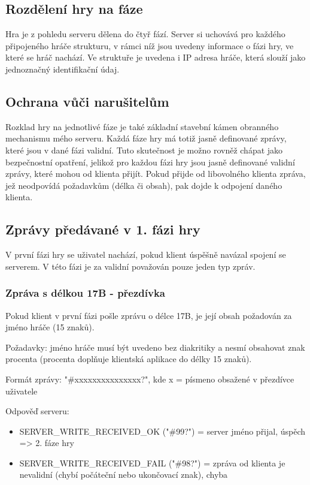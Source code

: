 \documentclass[12pt, a4paper, pdftex, czech, titlepage]{report}
\begin{document}
\subsection{Rozdělení hry na fáze}
Hra je z pohledu serveru dělena do čtyř fází. Server si uchovává pro každého připojeného hráče strukturu, v rámci
níž jsou uvedeny informace o fázi hry, ve které se hráč nachází. Ve struktuře 
je uvedena i IP adresa hráče, která slouží jako jednoznačný identifikační
údaj.

\subsection{Ochrana vůči narušitelům}
Rozklad hry na jednotlivé fáze je také základní stavební kámen obranného mechanismu mého serveru.
Každá fáze hry má totiž jasně definované zprávy, které jsou v dané fázi validní.
Tuto skutečnost je možno rovněž chápat jako bezpečnostní opatření, jelikož pro každou fázi hry jsou jasně definované
validní zprávy, které mohou od klienta přijít. Pokud přijde od libovolného klienta 
zpráva, jež neodpovídá požadavkům (délka či obsah), pak dojde k odpojení daného klienta.

\subsection{Zprávy předávané v 1. fázi hry}
V první fázi hry se uživatel nachází, pokud klient
úspěšně navázal spojení se serverem. V této fázi
je za validní považován pouze jeden typ zpráv.

\subsubsection{Zpráva s délkou 17B - přezdívka}
Pokud klient v první fázi pošle zprávu o délce 17B,
je její obsah požadován za jméno hráče (15 znaků). 

Požadavky: jméno hráče musí být uvedeno bez diakritiky a nesmí obsahovat
znak procenta (procenta doplňuje klientská aplikace do délky 15 znaků).

Formát zprávy: "\#xxxxxxxxxxxxxxx?", kde x = písmeno obsažené v přezdívce uživatele

Odpověď serveru:
\begin{itemize}
\item SERVER\_WRITE\_RECEIVED\_OK ("\#99?") = server jméno přijal, úspěch => 2. fáze hry
\item SERVER\_WRITE\_RECEIVED\_FAIL ("\#98?") = zpráva od klienta je nevalidní (chybí počáteční nebo ukončovací znak), chyba
\end{itemize}
\end{document}
